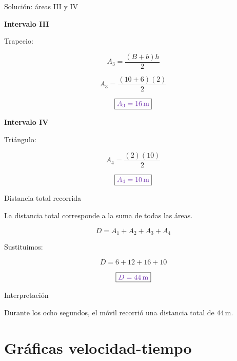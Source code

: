 \documentclass[aspectratio=169,10pt]{beamer}
\newcommand{\resultado}[1]{
\[
\boxed{\color{morado}#1}
\]
}
\begin{document}
\begin{frame}{Solución: áreas III y IV}

\textbf{Intervalo III}

Trapecio:

\[
A_3=\frac{(B+b)h}{2}
\]

\[
A_3=\frac{(10+6)(2)}{2}
\]

\resultado{A_3=16\,\mathrm{m}}

\textbf{Intervalo IV}

Triángulo:

\[
A_4=\frac{(2)(10)}{2}
\]

\resultado{A_4=10\,\mathrm{m}}

\end{frame}

\begin{frame}{Distancia total recorrida}

La distancia total corresponde
a la suma de todas las áreas.

\[
D=A_1+A_2+A_3+A_4
\]

Sustituimos:

\[
D=6+12+16+10
\]

\resultado{D=44\,\mathrm{m}}

\begin{exampleblock}{Interpretación}

Durante los ocho segundos,
el móvil recorrió una distancia
total de $44\,\mathrm{m}$.

\end{exampleblock}

\end{frame}

\section{Gráficas velocidad-tiempo}
\end{document}
